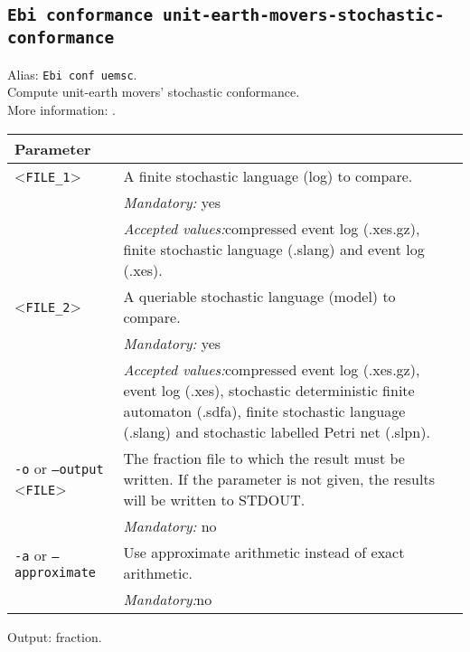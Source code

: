 {\subsection{\texttt{Ebi conformance unit-earth-movers-stochastic-conformance}}
Alias: \texttt{Ebi conf uemsc}.\\
Compute unit-earth movers' stochastic conformance.\\
More information: \cite{DBLP:conf/bpm/LeemansSA19}.\\
\begin{tabularx}{\linewidth}{lX}
\toprule
Parameter \\\midrule
<\texttt{FILE\_1}>&A finite stochastic language (log) to compare.\\
&\textit{Mandatory:} \quad yes\\
&\textit{Accepted values:}\quad compressed event log (.xes.gz), finite stochastic language (.slang) and event log (.xes).\\
<\texttt{FILE\_2}>&A queriable stochastic language (model) to compare.\\
&\textit{Mandatory:} \quad yes\\
&\textit{Accepted values:}\quad compressed event log (.xes.gz), event log (.xes), stochastic deterministic finite automaton (.sdfa), finite stochastic language (.slang) and stochastic labelled Petri net (.slpn).\\
\texttt{-o} or \texttt{--output} <\texttt{FILE}> &
The fraction file to which the result must be written. If the parameter is not given, the results will be written to STDOUT.\\
&\textit{Mandatory:} \quad no\\
\texttt{-a} or \texttt{--approximate} & Use approximate arithmetic instead of exact arithmetic.\\
&\textit{Mandatory:}\quad no\\
\bottomrule
\end{tabularx}
Output: fraction.
}
